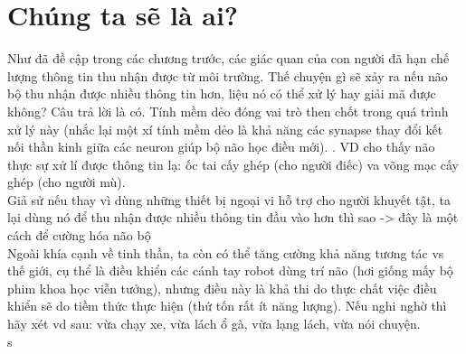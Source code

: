 \documentclass{article}
\newcommand\tab[1][1cm]{\hspace*{#1}}
\begin{document}
\section{Chúng ta sẽ là ai?}
\tab Như đã đề cập trong các chương trước, các giác quan của con người đã hạn chế lượng thông tin thu nhận 
được từ môi trường. Thế chuyện gì sẽ xảy ra nếu não bộ thu nhận được nhiều thông tin hơn, liệu nó có thể xử lý
hay giải mã được không? Câu trả lời là có. Tính mềm dẻo đóng vai trò then chốt trong quá trình xử lý này (nhắc lại
một xí tính mềm dẻo là khả năng các synapse thay đổi kết nối thần kinh giữa các neuron giúp bộ não học điều mới).
. VD cho thấy não thực sự xử lí được thông tin lạ: ốc tai cấy ghép (cho người điếc) va võng mạc cấy ghép
(cho người mù). \\
\tab Giả sử nếu thay vì dùng những thiết bị ngoại vi hỗ trợ cho người khuyết tật, ta lại dùng nó để thu nhận được
nhiều thông tin đầu vào hơn thì sao -> đây là một cách để cường hóa não bộ\\
\tab Ngoài khía cạnh về tinh thần, ta còn có thể tăng cường khả năng tương tác vs thế giới, cụ thể là điều khiển các
cánh tay robot dùng trí não (hơi giống mấy bộ phim khoa học viễn tưởng), nhưng điều này là khả thi do thực chất việc 
điều khiển sẽ do tiềm thức thực hiện (thứ tốn rất ít năng lượng). Nếu nghi nghờ thì hãy xét vd sau: vừa chạy xe, vừa 
lách ổ gà, vừa lạng lách, vừa nói chuyện.\\s
\end{document}
